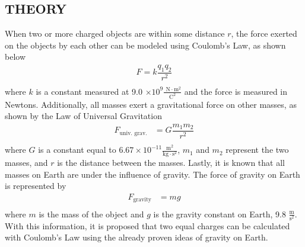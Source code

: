 \documentclass [12pt, letterpaper, twoside] {article}
\begin{document}
\subsection* {THEORY}
\noindent
When two or more charged objects are within some distance \(r\), the force exerted on the objects by each other can be modeled using Coulomb's Law, as shown below
\begin {equation}
  \begin {split}
    F = k\dfrac{q_{1}q_{2}}{r^2} \\
  \end {split}
\end {equation}
where \(k\) is a constant measured at 9.0 \(\times 10^9 \tfrac{\text{ N}\cdot\text{m}^2}{\text{C}^2}\) and the force is measured in Newtons. Additionally, all masses exert a gravitational force on other masses, as shown by the Law of Universal Gravitation
\begin {equation}
  \begin {split}
    F_{\text{univ. grav.}} &= G\dfrac{m_{1}m_{2}}{r^2} \\
  \end {split}
\end {equation}
where \(G\) is a constant equal to \(6.67\times{10^{-11}}\tfrac{\text{m}^2}{\text{kg}\cdot{\text{s}^2}}\), \(m_{1}\) and \(m_{2}\) represent the two masses, and \(r\) is the distance between the masses. Lastly, it is known that all masses on Earth are under the influence of gravity. The force of gravity on Earth is represented by
\begin{equation}
  \begin{split}
    F_{\text{gravity}} &= mg \\
  \end{split}
\end{equation}
where \(m\) is the mass of the object and \(g\) is the gravity constant on Earth, 9.8 \(\tfrac{\text{m}}{\text{s}^2}\). With this information, it is proposed that two equal charges can be calculated with Coulomb's Law using the already proven ideas of gravity on Earth.
\end{document}

